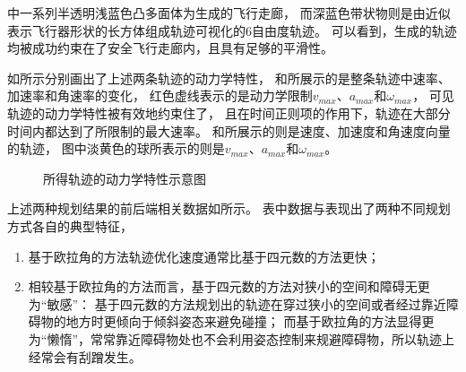 中一系列半透明浅蓝色凸多面体为生成的飞行走廊，
而深蓝色带状物则是由近似表示飞行器形状的长方体组成轨迹可视化的6自由度轨迹。
可以看到，生成的轨迹均被成功约束在了安全飞行走廊内，且具有足够的平滑性。

如所示分别画出了上述两条轨迹的动力学特性，
和所展示的是整条轨迹中速率、加速率和角速率的变化，
红色虚线表示的是动力学限制$v_{max}$、$a_{max}$和$\omega_{max}$，
可见轨迹的动力学特性被有效地约束住了，
且在时间正则项的作用下，轨迹在大部分时间内都达到了所限制的最大速率。
和所展示的则是速度、加速度和角速度向量的轨迹，
图中淡黄色的球所表示的则是$v_{max}$、$a_{max}$和$\omega_{max}$。

\begin{figure}[!ht]
    \setlength{\subfigcapskip}{-1bp}
    \centering
    \begin{minipage}{\textwidth}

    \centering
    \subfigure{\label{fig:dyn_prop_quat}}\addtocounter{subfigure}{-2}
    \hspace{0.2em}
    \subfigure{\label{fig:dyn_prop_3d_quat}}\addtocounter{subfigure}{-2}

    \centering
    \subfigure{\label{fig:dyn_prop_rpy}}\addtocounter{subfigure}{-2}
    \hspace{0.2em}
    \subfigure{\label{fig:dyn_prop_3d_rpy}}\addtocounter{subfigure}{-2}
    
    \end{minipage}
    \caption{所得轨迹的动力学特性示意图}
    \label{fig:dynamic_properties}
\end{figure}

上述两种规划结果的前后端相关数据如所示。
表中数据与表现出了两种不同规划方式各自的典型特征，
\begin{enumerate}
    \renewcommand{\labelenumi}{(\theenumi)}
    \item 基于欧拉角的方法轨迹优化速度通常比基于四元数的方法更快；
    \item 相较基于欧拉角的方法而言，基于四元数的方法对狭小的空间和障碍无更为“敏感”：
    基于四元数的方法规划出的轨迹在穿过狭小的空间或者经过靠近障碍物的地方时更倾向于倾斜姿态来避免碰撞；
    而基于欧拉角的方法显得更为“懒惰”，常常靠近障碍物处也不会利用姿态控制来规避障碍物，所以轨迹上经常会有刮蹭发生。
\end{enumerate}

